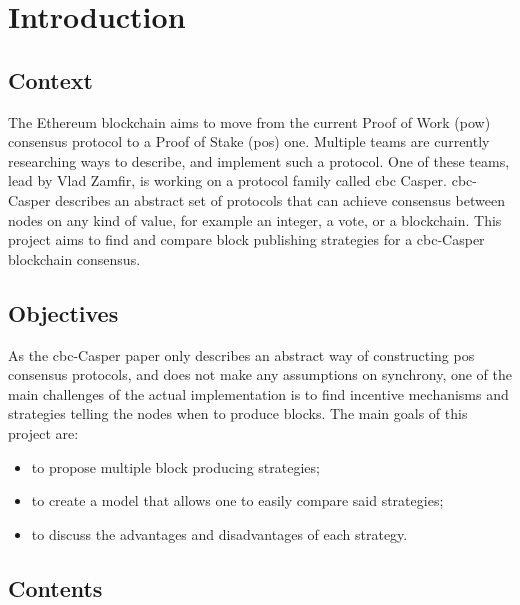 \chapter{Introduction}
\label{chap:introduction}

\section{Context}

The Ethereum blockchain aims to move from the current Proof of Work (\gls{pow})
consensus protocol to a Proof of Stake (\gls{pos}) one. Multiple teams are
currently researching ways to describe, and implement such a protocol. One of
these teams, lead by Vlad Zamfir, is working on a protocol family called
\gls{cbc} Casper.  \gls{cbc}-Casper describes an abstract set of protocols that
can achieve consensus between nodes on any kind of value, for example an integer, a vote,
or a blockchain. This project aims to find and compare block publishing
strategies for a \gls{cbc}-Casper blockchain consensus.

\section{Objectives}
As the \gls{cbc}-Casper paper only describes an abstract way of constructing
\gls{pos} consensus protocols, and does not make any assumptions on synchrony,
one of the main challenges of the actual implementation is to find incentive
mechanisms and strategies telling the nodes when to produce blocks.  The main
goals of this project are:

\begin{itemize}
        \item to propose multiple block producing strategies;
        \item to create a model that allows one to easily compare said strategies;
        \item to discuss the advantages and disadvantages of each strategy.
\end{itemize}

\section{Contents}



